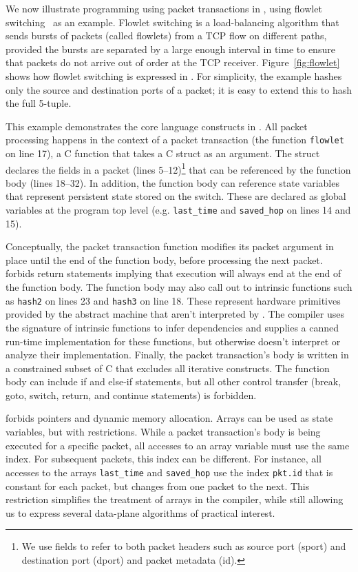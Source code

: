 We now illustrate programming using packet transactions in \pktlanguage, using
flowlet switching~\cite{flowlets} as an example. Flowlet switching is a
load-balancing algorithm that sends bursts of packets (called flowlets) from a
TCP flow on different paths, provided the bursts are separated by a large
enough interval in time to ensure that packets do not arrive out of order at
the TCP receiver. Figure~\ref{fig:flowlet} shows how flowlet switching is
expressed in \pktlanguage. For simplicity, the example hashes only the source
and destination ports of a packet; it is easy to extend this to hash the full
5-tuple.

This example demonstrates the core language constructs in \pktlanguage. All
packet processing happens in the context of a packet transaction (the function
\texttt{flowlet} on line 17), a C function that takes a C struct as an
argument. The struct declares the fields in a packet (lines 5--12)\footnote{We
  use fields to refer to both packet headers such as source port (sport) and
destination port (dport) and packet metadata (id).} that can be referenced by the
function body (lines 18--32).  In addition, the function body can reference
state variables that represent persistent state stored on the switch. These are
declared as global variables at the program top level (e.g. \texttt{last\_time}
and \texttt{saved\_hop} on lines 14 and 15).

Conceptually, the packet transaction function modifies its packet argument in
place until the end of the function body, before processing the next packet.
\pktlanguage forbids return statements implying that execution will always end at the
end of the function body. The function body may also call out to intrinsic
functions such as \texttt{hash2} on lines 23 and \texttt{hash3} on line 18.
These represent hardware primitives provided by the abstract machine that
aren't interpreted by \pktlanguage. The \pktlanguage compiler uses the
signature of intrinsic functions to infer dependencies and supplies a canned
run-time implementation for these functions, but otherwise doesn't interpret or
analyze their implementation. Finally, the packet
transaction's body is written in a constrained subset of C that excludes all
iterative constructs. The function body can include if and else-if statements,
but all other control transfer (break, goto, switch, return, and continue
statements) is forbidden.

\pktlanguage forbids pointers and dynamic memory allocation. Arrays can be used
as state variables, but with restrictions. While a packet transaction's body is
being executed for a specific packet, all accesses to an array variable must use the
same index. For subsequent packets, this index can be different. For instance,
all accesses to the arrays \texttt{last\_time} and \texttt{saved\_hop} use the
index \texttt{pkt.id} that is constant for each packet, but changes from one
packet to the next. This restriction simplifies the treatment of arrays in the
compiler, while still allowing us to express several data-plane algorithms of
practical interest.

